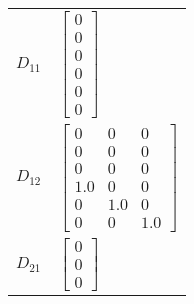 \begin{tabular}{cl}
 $D_{11}$ & $\left[\begin{matrix}0\\0\\0\\0\\0\\0\end{matrix}\right]$                                                                                                                                                                                                                                                                                                                                                                                                                                                                                                                                                                                                                                                                           \\
 $D_{12}$ & $\left[\begin{matrix}0 & 0 & 0\\0 & 0 & 0\\0 & 0 & 0\\1.0 & 0 & 0\\0 & 1.0 & 0\\0 & 0 & 1.0\end{matrix}\right]$                                                                                                                                                                                                                                                                                                                                                                                                                                                                                                                                                                                                                     \\
 $D_{21}$ & $\left[\begin{matrix}0\\0\\0\end{matrix}\right]$                                                                                                                                                                                                                                                                                                                                                                                                                                                                                                                                                                                                                                                                                    \\
\hline
\end{tabular}